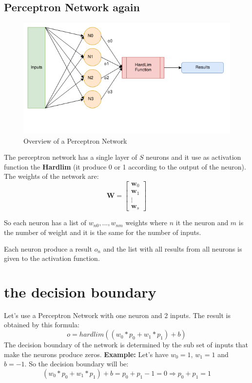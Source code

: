 \subsection{Perceptron Network again}
\begin{figure}
    \centering
    \includegraphics[scale=0.65]{img/PerceptronNetwork.png}
    \caption{Overview of a Perceptron Network}
    \label{img:perceptron_network}
\end{figure}
The perceptron network has a single layer of $S$ neurons and it use as activation function the \textbf{Hardlim} (it produce 0 or 1 according to the output of the neuron).
The weights of the network are:
\begin{equation}
\textbf{W} = \begin{bmatrix}
\textbf{w}_0 \\ \textbf{w}_1 \\ \vdots \\ \textbf{w}_s 
\end{bmatrix}
\end{equation}

So each neuron has a list of $w_{n0}, ... , w_{nm}$ weights where $n$ it the neuron and $m$ is the number of weight and it is the same for the number of inputs.

Each neuron produce a result $o_n$ and the list with all results from all neurons is given to the activation function.

\section*{the decision boundary}
Let's use a Perceptron Network with one neuron and 2 inputs. The result is obtained by this formula:
\begin{equation}
o = hardlim((w_0 * p_0 + w_1 * p_1) + b)
\end{equation}
The decision boundary of the network is determined by the sub set of inputs that make the neurons produce zeros.
\newline
\textbf{Example:}
Let's have $w_0 = 1$, $w_1= 1$ and $b = -1$. So the decision boundary will be:
\begin{equation}
(w_0 * p_0 + w_1 * p_1) + b = p_0 + p_1 - 1 = 0 \Rightarrow p_0 + p_1 = 1
\end{equation} 

